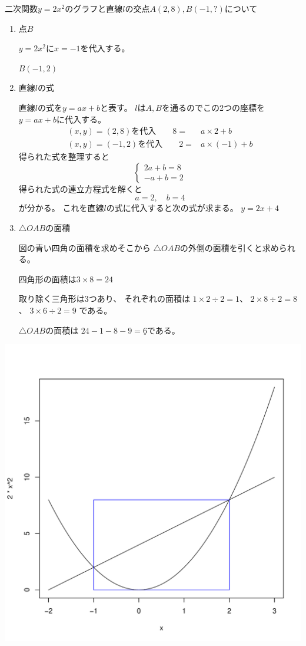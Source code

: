 \documentclass[12pt,b5paper]{ltjsarticle}
\begin{document}
二次関数$y=2x^2$のグラフと直線$l$の交点$A(2,8),B(-1,?)$について
\begin{enumerate}
 \item 点$B$

       $y=2x^2$に$x=-1$を代入する。

       \underline{$B(-1,2)$}
 \item 直線$l$の式

       直線$l$の式を$y=ax+b$と表す。
       $l$は$A,B$を通るのでこの2つの座標を
       $y=ax+b$に代入する。
       \begin{align}
        (x,y)=(2,8)を代入 \qquad 8=& a\times 2 +b\\
        (x,y)=(-1,2)を代入 \qquad 2=& a \times (-1) +b
       \end{align}
       得られた式を整理すると
       \begin{equation}
        \begin{cases}
         2a+b=8\\
         -a+b=2
        \end{cases}
       \end{equation}
       得られた式の連立方程式を解くと
       \begin{equation}
        a=2, \quad b=4
       \end{equation}
       が分かる。
       これを直線$l$の式に代入すると次の式が求まる。
       \underline{$y=2x+4$}
       
 \item $\triangle OAB$の面積


       図の青い四角の面積を求めそこから
       $\triangle OAB$の外側の面積を引くと求められる。

       四角形の面積は$3\times8=24$

       取り除く三角形は3つあり、
       それぞれの面積は
       $1\times2\div2=1$、
       $2\times8\div2=8$、
       $3\times6\div2=9$
       である。

       $\triangle OAB$の面積は
       $24-1-8-9=\underline{6}$である。

\end{enumerate}

        \includegraphics[scale=0.3]{graph.pdf}
\end{document}
